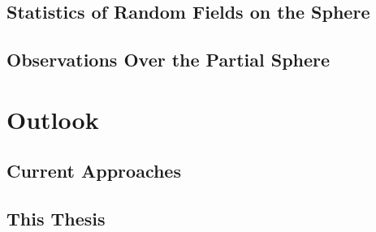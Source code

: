 \subsection{Statistics of Random Fields on the Sphere}

\subsection{Observations Over the Partial Sphere}

\section{Outlook}

\subsection{Current Approaches}

\subsection{This Thesis}
